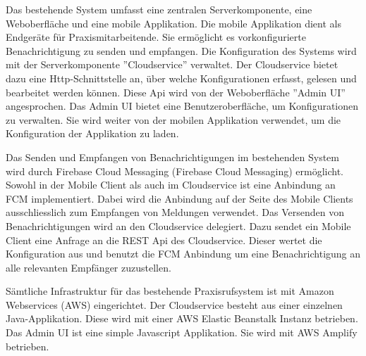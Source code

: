 Das bestehende System umfasst eine zentralen Serverkomponente, eine Weboberfläche und eine mobile Applikation.
Die mobile Applikation dient als Endgeräte für Praxismitarbeitende.
Sie ermöglicht es vorkonfigurierte Benachrichtigung zu senden und empfangen.
Die Konfiguration des Systems wird mit der Serverkomponente ''Cloudservice'' verwaltet.
Der Cloudservice bietet dazu eine Http-Schnittstelle an, über welche Konfigurationen erfasst, gelesen und bearbeitet werden können.
Diese Api wird von der Weboberfläche ''Admin UI'' angesprochen.
Das Admin UI bietet eine Benutzeroberfläche, um Konfigurationen zu verwalten.
Sie wird weiter von der mobilen Applikation verwendet, um die Konfiguration der Applikation zu laden.

Das Senden und Empfangen von Benachrichtigungen im bestehenden System wird durch Firebase Cloud Messaging (Firebase Cloud Messaging) ermöglicht.
Sowohl in der Mobile Client als auch im Cloudservice ist eine Anbindung an FCM implementiert.
Dabei wird die Anbindung auf der Seite des Mobile Clients ausschliesslich zum Empfangen von Meldungen verwendet.
Das Versenden von Benachrichtigungen wird an den Cloudservice delegiert.
Dazu sendet ein Mobile Client eine Anfrage an die REST Api des Cloudservice.
Dieser wertet die Konfiguration aus und benutzt die FCM Anbindung um eine Benachrichtigung an alle relevanten Empfänger zuzustellen.

Sämtliche Infrastruktur für das bestehende Praxisrufsystem ist mit Amazon Webservices (AWS) eingerichtet.
Der Cloudservice besteht aus einer einzelnen Java-Applikation.
Diese wird mit einer AWS Elastic Beanstalk Instanz betrieben.
Das Admin UI ist eine simple Javascript Applikation.
Sie wird mit AWS Amplify betrieben.\cite{ip5}

